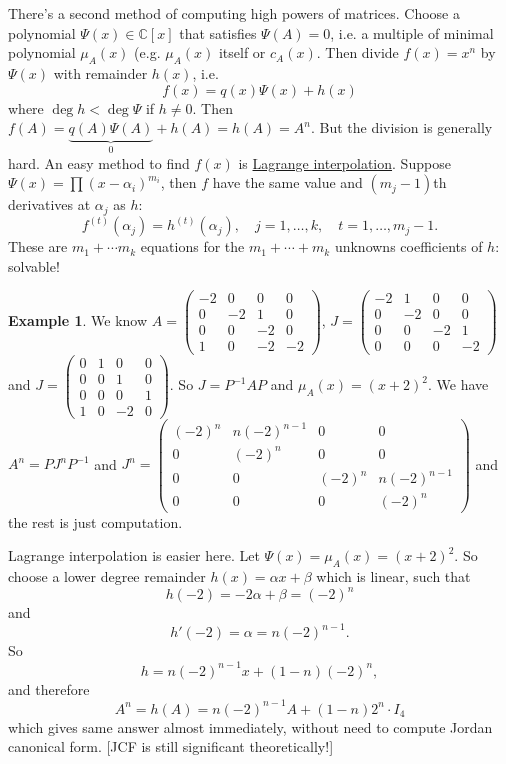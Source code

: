 \documentclass[a4paper]{article}
\theoremstyle{definition}
\newtheorem{example}[defn]{Example}
\begin{document}
There's a second method of computing high powers of matrices. Choose a polynomial $\Psi(x)\in \mathbb C[x]$ that satisfies $\Psi(A)=0$, i.e. a multiple of minimal polynomial $\mu_A(x)$ (e.g. $\mu_A(x)$ itself or $c_A(x)$. Then divide $f(x)=x^n$ by $\Psi(x)$ with remainder $h(x)$, i.e.
\[
f(x)=q(x)\Psi (x)+h(x)
\]
where $\deg h<\deg \Psi$ if $h\neq 0$. Then $f(A)=\underbrace{q(A)\Psi(A)}_0+h(A)=h(A)=A^n$. But the division is generally hard. An easy method to find $f(x)$ is \underline{Lagrange interpolation}. Suppose $\Psi(x)=\prod (x-\alpha_i)^{m_i}$, then $f$ have the same value and $(m_j-1)$th derivatives at $\alpha_j$ as $h$:
\[
f^{(t)}(\alpha_j)=h^{(t)}(\alpha_j),\quad j=1,\ldots,k,\quad t=1,\ldots,m_j-1 .
\]
These are $m_1+\cdots m_k$ equations for the $m_1+\cdots +m_k$ unknowns coefficients of $h$: solvable!
\begin{example}
We know $A=\begin{pmatrix}-2&0&0&0\\0&-2&1&0\\0&0&-2&0\\1&0&-2&-2\end{pmatrix}$, $J=\begin{pmatrix}-2&1&0&0\\0&-2&0&0\\0&0&-2&1\\0&0&0&-2\end{pmatrix}$ and $J=\begin{pmatrix}0&1&0&0\\0&0&1&0\\0&0&0&1\\1&0&-2&0\end{pmatrix}$. So $J=P^{-1}AP$ and $\mu_A(x)=(x+2)^2$. We have $A^n=PJ^nP^{-1}$ and $J^n=\begin{pmatrix}(-2)^n & n(-2)^{n-1} &0 & 0 \\ 0 & (-2)^n & 0&0 \\ 0&0&(-2)^n & n(-2)^{n-1} \\ 0&0&0&(-2)^n\end{pmatrix}$ and the rest is just computation.

Lagrange interpolation is easier here. Let $\Psi(x)=\mu_A(x)=(x+2)^2$. So choose a lower degree remainder $h(x)=\alpha x+\beta$ which is linear, such that
\[
h(-2)=-2\alpha+\beta=(-2)^n
\]
and
\[
h'(-2)=\alpha=n(-2)^{n-1} .
\]
So
\[
h=n(-2)^{n-1}x+(1-n)(-2)^n,
\]
and therefore
\[
A^n=h(A)=n(-2)^{n-1}A+(1-n)2^n \cdot I_4
\]
which gives same answer almost immediately, without need to compute Jordan canonical form. [JCF is still significant theoretically!]
\end{example}
\end{document}
